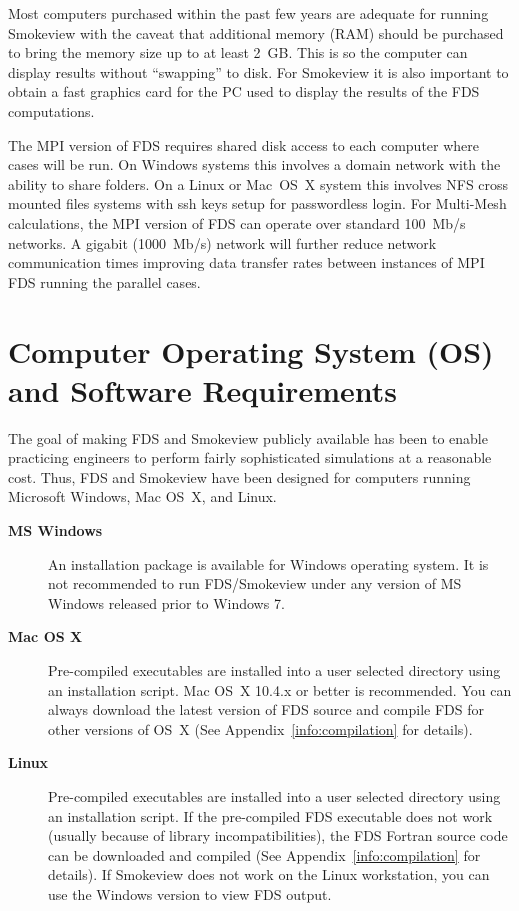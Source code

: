\documentclass[11pt]{book}
\begin{document}
Most computers purchased within the past few years are adequate for running Smokeview with the caveat that additional memory (RAM) should be purchased to bring the memory size up to at least 2~GB. This is so the computer can display results without ``swapping'' to disk. For Smokeview it is also important to obtain a fast graphics card for the PC used to display the results of the FDS computations.

The MPI version of FDS requires shared disk access to each computer where cases will be run.  On Windows systems this involves a domain network with the ability to share folders.  On a Linux or Mac~OS~X system this involves NFS cross mounted files systems with ssh keys setup for passwordless login. For Multi-Mesh calculations, the MPI version of FDS can operate over standard 100~Mb/s networks. A gigabit (1000~Mb/s) network will further reduce network communication times improving data transfer rates between instances of MPI FDS running the parallel cases.


\section{Computer Operating System (OS) and Software Requirements}

The goal of making FDS and Smokeview publicly available has been to enable practicing engineers to perform fairly sophisticated simulations at a reasonable cost. Thus, FDS and Smokeview have been designed for computers running Microsoft Windows, Mac OS~X, and Linux.
\begin{description}
\item[{\bf MS Windows}] An installation package is available for Windows operating system. It is not recommended to run FDS/Smokeview under any version of MS Windows released prior to Windows 7.
\item[{\bf Mac OS X}] Pre-compiled executables are installed into a user selected directory using an installation script.  Mac OS~X 10.4.x or better is recommended. You can always download the latest version of FDS source and compile FDS for other versions of OS~X (See Appendix~\ref{info:compilation} for details).
\item[{\bf Linux}] Pre-compiled executables are installed into a user selected directory using an installation script. If the pre-compiled FDS executable does not work (usually because of library incompatibilities), the FDS Fortran source code can be downloaded and compiled (See Appendix~\ref{info:compilation} for details). If Smokeview does not work on the Linux workstation, you can use the Windows version to view FDS output.
\end{description}
\end{document}
